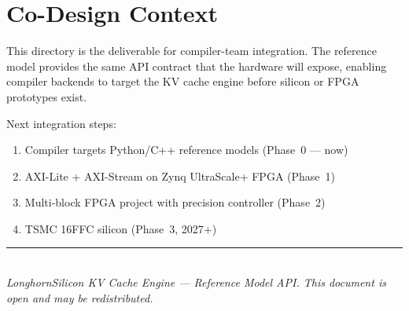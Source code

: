 \documentclass[11pt]{article}
\begin{document}
\section{Co-Design Context}
\label{sec:codesign}

This directory is the deliverable for compiler-team integration.
The reference model provides the same API contract that the hardware
will expose, enabling compiler backends to target the KV cache engine
before silicon or FPGA prototypes exist.

\medskip
\noindent Next integration steps:
\begin{enumerate}
\item Compiler targets Python/C++ reference models (Phase~0 --- now)
\item AXI-Lite + AXI-Stream on Zynq UltraScale+ FPGA (Phase~1)
\item Multi-block FPGA project with precision controller (Phase~2)
\item TSMC 16FFC silicon (Phase~3, 2027+)
\end{enumerate}

\vspace{0.5in}
\noindent\rule{\textwidth}{0.4pt}\\
\noindent\small\textit{LonghornSilicon KV Cache Engine --- Reference Model API.
This document is open and may be redistributed.}
\end{document}
